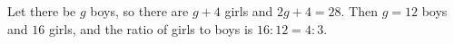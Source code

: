 Let there be $g$ boys, so there are $g+4$ girls and $2g+4=28$. Then $g=12$ boys and $16$ girls, and the ratio of girls to boys is $16:12=\boxed{4:3}$.
